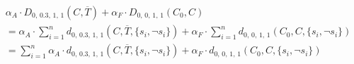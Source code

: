 \documentclass{standalone}
\begin{document}
$\begin{aligned}
&\alpha_{A}\cdot D_{0,\, 0.3,\, 1,\, 1}(C, \overline{T})+ \alpha_{F}\cdot D_{0,\, 0,\, 1,\, 1}(C_{0}, C)\\  
&= \alpha_{A}\cdot\sum_{i=1}^{n} d_{0,\, 0.3,\, 1,\, 1}(C, \overline{T}, \lbrace s_{i}, \neg s_{i}\rbrace) + \alpha_{F}\cdot\sum_{i=1}^{n} d_{0,\, 0,\, 1,\, 1}(C_{0}, C, \lbrace s_{i}, \neg s_{i}\rbrace)\\
&= \sum_{i=1}^{n} \alpha_{A}\cdot d_{0,\, 0.3,\, 1,\, 1}(C, \overline{T}, \lbrace s_{i}, \neg s_{i}\rbrace) + \alpha_{F}\cdot d_{0,\, 0,\, 1,\, 1}(C_{0}, C, \lbrace s_{i}, \neg s_{i}\rbrace)
\end{aligned}$
\end{document}
